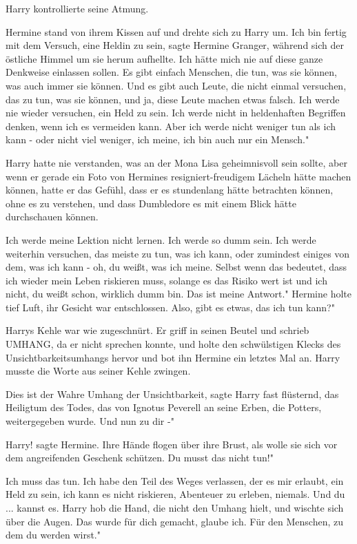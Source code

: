 Harry kontrollierte seine Atmung.

Hermine stand von ihrem Kissen auf und drehte sich zu Harry um. \glqq Ich bin
fertig mit dem Versuch, eine Heldin zu sein\grqq{}, sagte Hermine Granger,
während sich der östliche Himmel um sie herum aufhellte. \glqq Ich hätte mich
nie auf diese ganze Denkweise einlassen sollen. Es gibt einfach Menschen, die
tun, was sie können, was auch immer sie können. Und es gibt auch Leute, die
nicht einmal versuchen, das zu tun, was sie können, und ja, diese Leute machen
etwas falsch. Ich werde nie wieder versuchen, ein Held zu sein. Ich werde nicht
in heldenhaften Begriffen denken, wenn ich es vermeiden kann. Aber ich werde
nicht weniger tun als ich kann - oder nicht viel weniger, ich meine, ich bin
auch nur ein Mensch."

Harry hatte nie verstanden, was an der Mona Lisa geheimnisvoll sein sollte, aber
wenn er gerade ein Foto von Hermines resigniert-freudigem Lächeln hätte machen
können, hatte er das Gefühl, dass er es stundenlang hätte betrachten können,
ohne es zu verstehen, und dass Dumbledore es mit einem Blick hätte durchschauen
können.

\glqq Ich werde meine Lektion nicht lernen. Ich werde so dumm sein. Ich werde
weiterhin versuchen, das meiste zu tun, was ich kann, oder zumindest einiges von
dem, was ich kann - oh, du weißt, was ich meine. Selbst wenn das bedeutet, dass
ich wieder mein Leben riskieren muss, solange es das Risiko wert ist und ich
nicht, du weißt schon, wirklich dumm bin. Das ist meine Antwort." Hermine holte
tief Luft, ihr Gesicht war entschlossen. \glqq Also, gibt es etwas, das ich tun
kann?"

Harrys Kehle war wie zugeschnürt. Er griff in seinen Beutel und schrieb UMHANG,
da er nicht sprechen konnte, und holte den schwülstigen Klecks des
Unsichtbarkeitsumhangs hervor und bot ihn Hermine ein letztes Mal an. Harry
musste die Worte aus seiner Kehle zwingen.

\glqq Dies ist der Wahre Umhang der Unsichtbarkeit\grqq{}, sagte Harry fast
flüsternd, \glqq das Heiligtum des Todes, das von Ignotus Peverell an seine
Erben, die Potters, weitergegeben wurde. Und nun zu dir -"

\glqq Harry!\grqq{} sagte Hermine. Ihre Hände flogen über ihre Brust, als wolle
sie sich vor dem angreifenden Geschenk schützen. \glqq Du musst das nicht tun!"

\glqq Ich muss das tun. Ich habe den Teil des Weges verlassen, der es mir
erlaubt, ein Held zu sein, ich kann es nicht riskieren, Abenteuer zu erleben,
niemals. Und du ... kannst es.\grqq{} Harry hob die Hand, die nicht den Umhang
hielt, und wischte sich über die Augen. \glqq Das wurde für dich gemacht, glaube
ich. Für den Menschen, zu dem du werden wirst."

